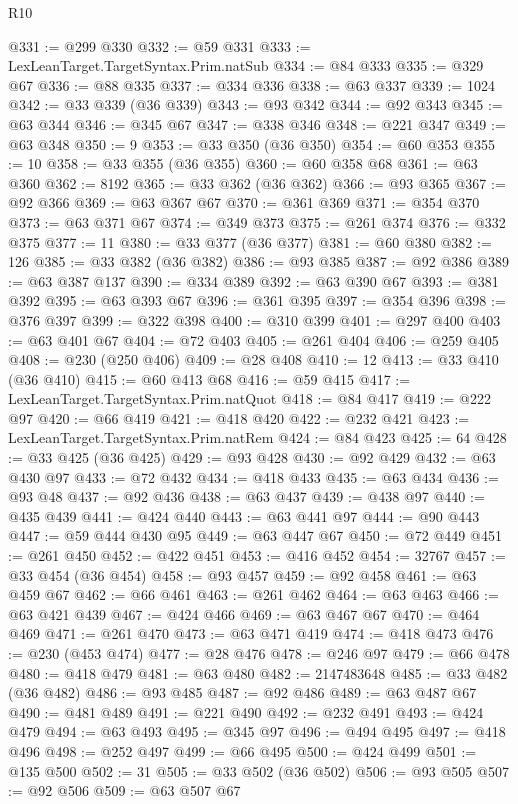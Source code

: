 \begin{lexlean}{R10}
\begin{coremodule}
@331 := @299 @330
@332 := @59 @331
@333 := LexLeanTarget.TargetSyntax.Prim.natSub
@334 := @84 @333
@335 := @329 @67
@336 := @88 @335
@337 := @334 @336
@338 := @63 @337
@339 := 1024
@342 := @33 @339 (@36 @339)
@343 := @93 @342
@344 := @92 @343
@345 := @63 @344
@346 := @345 @67
@347 := @338 @346
@348 := @221 @347
@349 := @63 @348
@350 := 9
@353 := @33 @350 (@36 @350)
@354 := @60 @353
@355 := 10
@358 := @33 @355 (@36 @355)
@360 := @60 @358 @68
@361 := @63 @360
@362 := 8192
@365 := @33 @362 (@36 @362)
@366 := @93 @365
@367 := @92 @366
@369 := @63 @367 @67
@370 := @361 @369
@371 := @354 @370
@373 := @63 @371 @67
@374 := @349 @373
@375 := @261 @374
@376 := @332 @375
@377 := 11
@380 := @33 @377 (@36 @377)
@381 := @60 @380
@382 := 126
@385 := @33 @382 (@36 @382)
@386 := @93 @385
@387 := @92 @386
@389 := @63 @387 @137
@390 := @334 @389
@392 := @63 @390 @67
@393 := @381 @392
@395 := @63 @393 @67
@396 := @361 @395
@397 := @354 @396
@398 := @376 @397
@399 := @322 @398
@400 := @310 @399
@401 := @297 @400
@403 := @63 @401 @67
@404 := @72 @403
@405 := @261 @404
@406 := @259 @405
@408 := @230 (@250 @406)
@409 := @28 @408
@410 := 12
@413 := @33 @410 (@36 @410)
@415 := @60 @413 @68
@416 := @59 @415
@417 := LexLeanTarget.TargetSyntax.Prim.natQuot
@418 := @84 @417
@419 := @222 @97
@420 := @66 @419
@421 := @418 @420
@422 := @232 @421
@423 := LexLeanTarget.TargetSyntax.Prim.natRem
@424 := @84 @423
@425 := 64
@428 := @33 @425 (@36 @425)
@429 := @93 @428
@430 := @92 @429
@432 := @63 @430 @97
@433 := @72 @432
@434 := @418 @433
@435 := @63 @434
@436 := @93 @48
@437 := @92 @436
@438 := @63 @437
@439 := @438 @97
@440 := @435 @439
@441 := @424 @440
@443 := @63 @441 @97
@444 := @90 @443
@447 := @59 @444 @430 @95
@449 := @63 @447 @67
@450 := @72 @449
@451 := @261 @450
@452 := @422 @451
@453 := @416 @452
@454 := 32767
@457 := @33 @454 (@36 @454)
@458 := @93 @457
@459 := @92 @458
@461 := @63 @459 @67
@462 := @66 @461
@463 := @261 @462
@464 := @63 @463
@466 := @63 @421 @439
@467 := @424 @466
@469 := @63 @467 @67
@470 := @464 @469
@471 := @261 @470
@473 := @63 @471 @419
@474 := @418 @473
@476 := @230 (@453 @474)
@477 := @28 @476
@478 := @246 @97
@479 := @66 @478
@480 := @418 @479
@481 := @63 @480
@482 := 2147483648
@485 := @33 @482 (@36 @482)
@486 := @93 @485
@487 := @92 @486
@489 := @63 @487 @67
@490 := @481 @489
@491 := @221 @490
@492 := @232 @491
@493 := @424 @479
@494 := @63 @493
@495 := @345 @97
@496 := @494 @495
@497 := @418 @496
@498 := @252 @497
@499 := @66 @495
@500 := @424 @499
@501 := @135 @500
@502 := 31
@505 := @33 @502 (@36 @502)
@506 := @93 @505
@507 := @92 @506
@509 := @63 @507 @67

\end{coremodule}
\end{lexlean}
